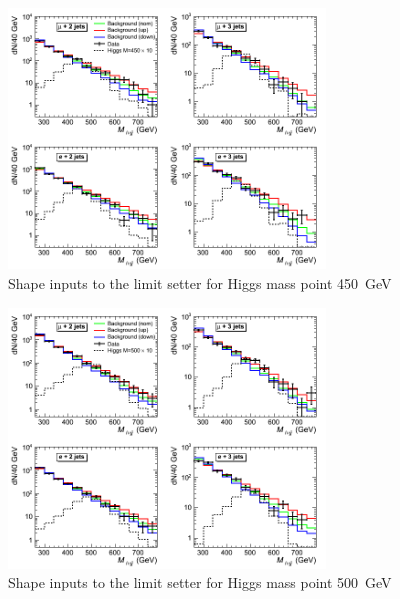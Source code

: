 \begin{figure}[h!]
\begin{center}
\includegraphics[width=0.75\textwidth]{plots/2012_SHAPES/hww-histo-shapes-M=450}
\caption{Shape inputs to the limit setter for Higgs mass point 450~GeV}
\end{center}
\end{figure}
\begin{figure}[h!]
\begin{center}
\includegraphics[width=0.75\textwidth]{plots/2012_SHAPES/hww-histo-shapes-M=500}
\caption{Shape inputs to the limit setter for Higgs mass point 500~GeV}
\end{center}
\end{figure}

\clearpage

